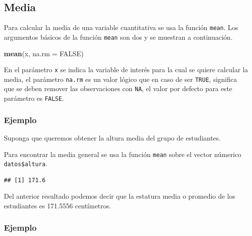 \documentclass[10pt,]{krantz}
\makeatletter
\newenvironment{Shaded}{\begin{snugshade}}{\end{snugshade}}
\newcommand{\KeywordTok}[1]{\textcolor[rgb]{0.13,0.29,0.53}{\textbf{#1}}}
\newcommand{\DataTypeTok}[1]{\textcolor[rgb]{0.13,0.29,0.53}{#1}}
\newcommand{\OtherTok}[1]{\textcolor[rgb]{0.56,0.35,0.01}{#1}}
\newcommand{\OperatorTok}[1]{\textcolor[rgb]{0.81,0.36,0.00}{\textbf{#1}}}
\newcommand{\NormalTok}[1]{#1}
\newenvironment{kframe}{%
\medskip{}
\setlength{\fboxsep}{.8em}
 \def\at@end@of@kframe{}%
 \ifinner\ifhmode%
  \def\at@end@of@kframe{\end{minipage}}%
  \begin{minipage}{\columnwidth}%
 \fi\fi%
 \def\FrameCommand##1{\hskip\@totalleftmargin \hskip-\fboxsep
 \colorbox{shadecolor}{##1}\hskip-\fboxsep
     \hskip-\linewidth \hskip-\@totalleftmargin \hskip\columnwidth}%
 \MakeFramed {\advance\hsize-\width
   \@totalleftmargin\z@ \linewidth\hsize
   \@setminipage}}%
 {\par\unskip\endMakeFramed%
 \at@end@of@kframe}
\renewenvironment{Shaded}{\begin{kframe}}{\end{kframe}}
\makeatother
\begin{document}
\subsection{\texorpdfstring{Media 
}{Media  }}\label{media}

Para calcular la media de una variable cuantitativa se usa la función
\texttt{mean}. Los argumentos básicos de la función \texttt{mean} son
dos y se muestran a continuación.

\begin{Shaded}
\begin{Highlighting}[]
\KeywordTok{mean}\NormalTok{(x, }\DataTypeTok{na.rm =} \OtherTok{FALSE}\NormalTok{)}
\end{Highlighting}
\end{Shaded}

En el parámetro \texttt{x} se indica la variable de interés para la cual
se quiere calcular la media, el parámetro \texttt{na.rm} es un valor
lógico que en caso de ser \texttt{TRUE}, significa que se deben remover
las observaciones con \texttt{NA}, el valor por defecto para este
parámetro es \texttt{FALSE}.

\subsubsection*{Ejemplo}\label{ejemplo-15}

Suponga que queremos obtener la altura media del grupo de estudiantes.

Para encontrar la media general se usa la función \texttt{mean} sobre el
vector númerico \texttt{datos\$altura}.

\begin{Shaded}
\end{Shaded}

\begin{verbatim}
## [1] 171.6
\end{verbatim}

Del anterior resultado podemos decir que la estatura media o promedio de
los estudiantes es 171.5556 centímetros.

\subsubsection*{Ejemplo}\label{ejemplo-16}
\end{document}

